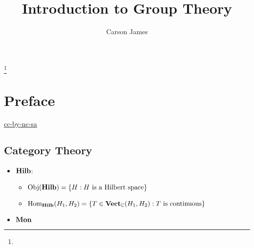 \documentclass{book}
\begin{document}
	
	\frontmatter
	
	\title{Introduction to Group Theory}
	
	
	\author{Carson James}
	\thanks{}
	
	\date{}
	
	\maketitle
	
	
	\setcounter{page}{4}
	
	\tableofcontents
	\printunsrtglossary[type=symbols,style=long,title={Notation}]
	
	
	\mainmatter
	
	\chapter*{Preface}
	
	\begin{flushleft}
		\href{https://creativecommons.org/licenses/by-nc-sa/4.0/legalcode.txt}{cc-by-nc-sa}
	\end{flushleft}
	
	\newpage
	
	
	\section{Category Theory}
	
	\begin{itemize}
		\item $\operatorname*{\text{\textbf{Hilb}}}$:  
		\begin{itemize}
			\item $\operatorname{Obj}(\operatorname*{\text{\textbf{Hilb}}}) = \{H: H \text{ is a Hilbert space}\}$
			\item $\operatorname{Hom}_{\operatorname*{\text{\textbf{Hilb}}}}(H_1, H_2) = \{T \in \operatorname*{\text{\textbf{Vect}}}_{\mathbb{C}}(H_1, H_2): T \text{ is continuous}\}$
		\end{itemize}
		\item $\operatorname*{\text{\textbf{Mon}}}$
	\end{itemize}
	
\end{document}
